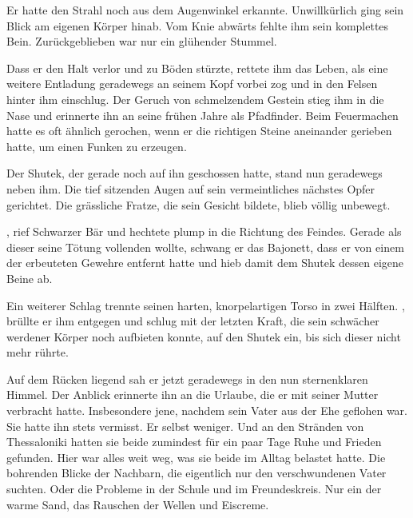 \par

Er hatte den Strahl noch aus dem Augenwinkel erkannte. Unwillkürlich ging sein Blick am eigenen Körper hinab. Vom Knie abwärts fehlte ihm sein komplettes Bein. Zurückgeblieben war nur ein glühender Stummel.

\par

Dass er den Halt verlor und zu Böden stürzte, rettete ihm das Leben, als eine weitere Entladung geradewegs an seinem Kopf vorbei zog und in den Felsen hinter ihm einschlug. Der Geruch von schmelzendem Gestein stieg ihm in die Nase und erinnerte ihn an seine frühen Jahre als Pfadfinder. Beim Feuermachen hatte es oft ähnlich gerochen, wenn er die richtigen Steine aneinander gerieben hatte, um einen Funken zu erzeugen.

\par

Der Shutek, der gerade noch auf ihn geschossen hatte, stand nun geradewegs neben ihm. Die tief sitzenden Augen auf sein vermeintliches nächstes Opfer gerichtet. Die grässliche Fratze, die sein Gesicht bildete, blieb völlig unbewegt.

\par

, rief Schwarzer Bär und hechtete plump in die Richtung des Feindes. Gerade als dieser seine Tötung vollenden wollte, schwang er das Bajonett, dass er von einem der erbeuteten Gewehre entfernt hatte und hieb damit dem Shutek dessen eigene Beine ab.

\par

Ein weiterer Schlag trennte seinen harten, knorpelartigen Torso in zwei Hälften. , brüllte er ihm entgegen und schlug mit der letzten Kraft, die sein schwächer werdener Körper noch aufbieten konnte, auf den Shutek ein, bis sich dieser nicht mehr rührte.

\par

Auf dem Rücken liegend sah er jetzt geradewegs in den nun sternenklaren Himmel. Der Anblick erinnerte ihn an die Urlaube, die er mit seiner Mutter verbracht hatte. Insbesondere jene, nachdem sein Vater aus der Ehe geflohen war. Sie hatte ihn stets vermisst. Er selbst weniger. Und an den Stränden von Thessaloniki hatten sie beide zumindest für ein paar Tage Ruhe und Frieden gefunden. Hier war alles weit weg, was sie beide im Alltag belastet hatte. Die bohrenden Blicke der Nachbarn, die eigentlich nur den verschwundenen Vater suchten. Oder die Probleme in der Schule und im Freundeskreis. Nur ein der warme Sand, das Rauschen der Wellen und Eiscreme.

